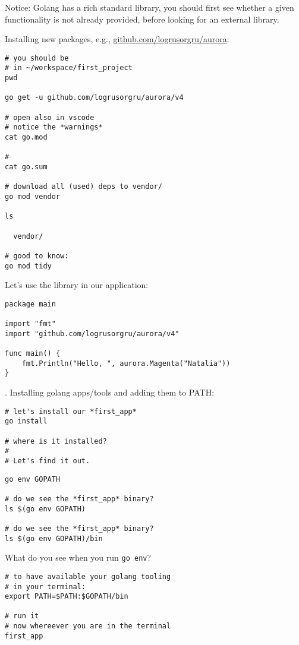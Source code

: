 \documentclass[11pt, letterpaper]{article}
\begin{document}
Notice: Golang has a rich standard library, you should first see whether a given functionality is not already provided, before looking for an external library.

Installing new packages, e.g., \href{https://github.com/logrusorgru/aurora}{github.com/logrusorgru/aurora}:

\begin{verbatim}
# you should be
# in ~/workspace/first_project
pwd

go get -u github.com/logrusorgru/aurora/v4

# open also in vscode
# notice the *warnings*
cat go.mod

# 
cat go.sum

# download all (used) deps to vendor/
go mod vendor

ls

  vendor/

# good to know:
go mod tidy
\end{verbatim}

Let's use the library in our application:

\begin{verbatim}
package main

import "fmt"
import "github.com/logrusorgru/aurora/v4"

func main() {
	fmt.Println("Hello, ", aurora.Magenta("Natalia"))
}
\end{verbatim}

. Installing golang apps/tools and adding them to {\small PATH}:

\begin{verbatim}
# let's install our *first_app*
go install

# where is it installed?
#
# Let's find it out.
\end{verbatim}

\begin{verbatim}
go env GOPATH

# do we see the *first_app* binary?
ls $(go env GOPATH)

# do we see the *first_app* binary?
ls $(go env GOPATH)/bin
\end{verbatim}

What do you see when you run \texttt{go env}?

\begin{verbatim}
# to have available your golang tooling
# in your terminal:
export PATH=$PATH:$GOPATH/bin

# run it
# now whereever you are in the terminal
first_app
\end{verbatim}
\end{document}
